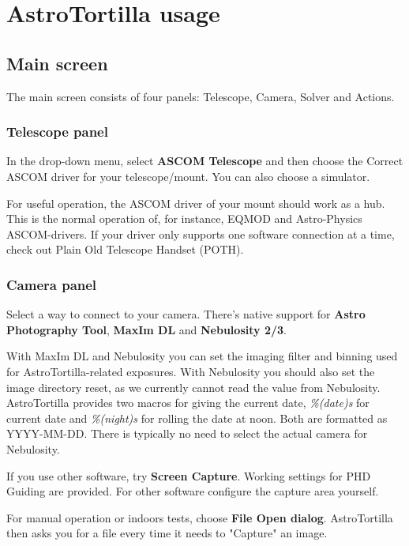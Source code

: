 \documentclass[english]{article}
\begin{document}
\newpage

\section{AstroTortilla usage}

\subsection{Main screen}

The main screen consists of four panels: Telescope, Camera, Solver and Actions.

\subsubsection{Telescope panel}

In the drop-down menu, select \textbf{ASCOM Telescope} and then choose the Correct 
ASCOM driver for your telescope/mount. You can also choose a simulator.

For useful operation, the ASCOM driver of your mount should work as a hub.
This is the normal operation of, for instance, EQMOD and Astro-Physics
ASCOM-drivers. If your driver only supports one software connection at a 
time, check out Plain Old Telescope Handset (POTH).

\subsubsection{Camera panel}

Select a way to connect to your camera. There's native support for \textbf{Astro Photography Tool}, \textbf{MaxIm DL} and \textbf{Nebulosity 2/3}. 

With MaxIm DL and Nebulosity you can set the imaging filter and binning used for AstroTortilla-related exposures. With Nebulosity you should also set the image directory reset, as we currently cannot read the value from Nebulosity. AstroTortilla provides two macros for giving the current date, \textit{\%(date)s} for current date and \textit{\%(night)s} for rolling the date at noon. Both are formatted as YYYY-MM-DD. There is typically no need to select the actual camera for Nebulosity.

If you use other software, try \textbf{Screen Capture}. Working settings for PHD Guiding are provided. For other software configure the capture area yourself.

For manual operation or indoors tests, choose \textbf{File Open dialog}. AstroTortilla then asks you for a file every time it needs to "Capture" an image.
\end{document}
